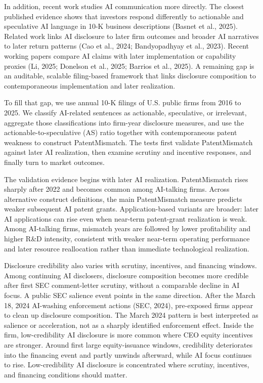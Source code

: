 In addition, recent work studies AI communication more directly. The closest published evidence shows that investors respond differently to actionable and speculative AI language in 10-K business descriptions (Basnet et al., 2025). Related work links AI disclosure to later firm outcomes and broader AI narratives to later return patterns (Cao et al., 2024; Bandyopadhyay et al., 2023). Recent working papers compare AI claims with later implementation or capability proxies (Li, 2025; Donelson et al., 2025; Barrios et al., 2025). A remaining gap is an auditable, scalable filing-based framework that links disclosure composition to contemporaneous implementation and later realization.

To fill that gap, we use annual 10-K filings of U.S. public firms from 2016 to 2025. We classify AI-related sentences as actionable, speculative, or irrelevant, aggregate those classifications into firm-year disclosure measures, and use the actionable-to-speculative (AS) ratio together with contemporaneous patent weakness to construct PatentMismatch. The tests first validate PatentMismatch against later AI realization, then examine scrutiny and incentive responses, and finally turn to market outcomes.

The validation evidence begins with later AI realization. PatentMismatch rises sharply after 2022 and becomes common among AI-talking firms. Across alternative construct definitions, the main PatentMismatch measure predicts weaker subsequent AI patent grants. Application-based variants are broader: later AI applications can rise even when near-term patent-grant realization is weak. Among AI-talking firms, mismatch years are followed by lower profitability and higher R\&D intensity, consistent with weaker near-term operating performance and later resource reallocation rather than immediate technological realization.

Disclosure credibility also varies with scrutiny, incentives, and financing windows. Among continuing AI disclosers, disclosure composition becomes more credible after first SEC comment-letter scrutiny, without a comparable decline in AI focus. A public SEC salience event points in the same direction. After the March 18, 2024 AI-washing enforcement actions (SEC, 2024), pre-exposed firms appear to clean up disclosure composition. The March 2024 pattern is best interpreted as salience or acceleration, not as a sharply identified enforcement effect. Inside the firm, low-credibility AI disclosure is more common where CEO equity incentives are stronger. Around first large equity-issuance windows, credibility deteriorates into the financing event and partly unwinds afterward, while AI focus continues to rise. Low-credibility AI disclosure is concentrated where scrutiny, incentives, and financing conditions should matter.

